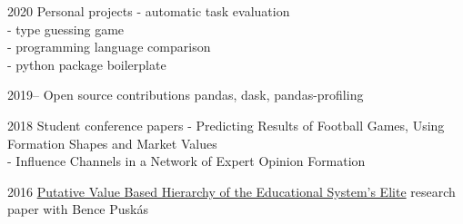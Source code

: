 \documentclass[]{friggeri-cv}
\begin{document}
\begin{entrylist}

\entry
{2020}
{Personal projects}
{}
{
- automatic task evaluation \href{https://github.com/endremborza/jkg_evaluators}{\faGithub}\\
- type guessing game \href{https://github.com/endremborza/typegame}{\faGithub}\\
- programming language comparison \href{https://github.com/endremborza/fibonacci_language_comparison}{\faGithub}\\
- python package boilerplate \href{https://github.com/endremborza/python_boilerplate}{\faGithub}
}

\entry
{2019--}
{Open source contributions}
{}
{pandas, dask, pandas-profiling}

\entry
{2018}
{Student conference papers}
{}
{- Predicting Results of Football Games, Using Formation Shapes and Market Values \\
- Influence Channels in a Network of Expert Opinion Formation}

\entry
{2016}
{\href{http://real.mtak.hu/47313/1/it_2016_02_6_borza_puskas.pdf}{Putative Value Based Hierarchy of the Educational System's Elite}}
{}
{research paper with Bence Puskás}

\end{entrylist}


\end{document}
